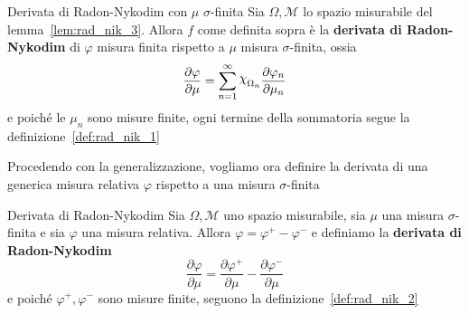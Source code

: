 \begin{definition}[label=def:rad_nik_2]{Derivata di Radon-Nykodim con \(\mu\)
    \(\sigma\)-finita}
    Sia \(\Omega, \mathcal{M}\) lo spazio misurabile del
    lemma~\ref{lem:rad_nik_3}. Allora \(f\) come definita sopra è la
    \textbf{derivata di Radon-Nykodim} di \(\varphi \) misura finita rispetto a
    \(\mu\) misura \(\sigma\)-finita, ossia
    \[
        \frac{\partial \varphi }{\partial \mu} = \sum_{n=1}^{\infty}
        \rchi_{\Omega_n} \frac{\partial \varphi_n}{\partial \mu_n}
    \]
    e poiché le \(\mu_n\) sono misure finite, ogni termine della sommatoria
    segue la definizione~\ref{def:rad_nik_1}

\end{definition}

Procedendo con la generalizzazione, vogliamo ora definire la derivata di una
generica misura relativa \(\varphi \) rispetto a una misura \(\sigma\)-finita

\begin{definition}[label=def:rad_nik]{Derivata di Radon-Nykodim}
    Sia \(\Omega, \mathcal{M}\) uno spazio misurabile, sia \(\mu\) una misura
    \(\sigma\)-finita e sia \(\varphi \) una misura relativa. Allora \(\varphi =
    \varphi^{+} - \varphi^{-}\) e definiamo la \textbf{derivata di Radon-Nykodim}
    \[
        \frac{\partial \varphi }{\partial \mu} = \frac{\partial \varphi^{+}}{\partial \mu} - \frac{\partial \varphi^{-}}{\partial \mu}
    \]
    e poiché \(\varphi^{+}, \varphi^{-}\) sono misure finite, seguono
    la definizione~\ref{def:rad_nik_2}
\end{definition}

